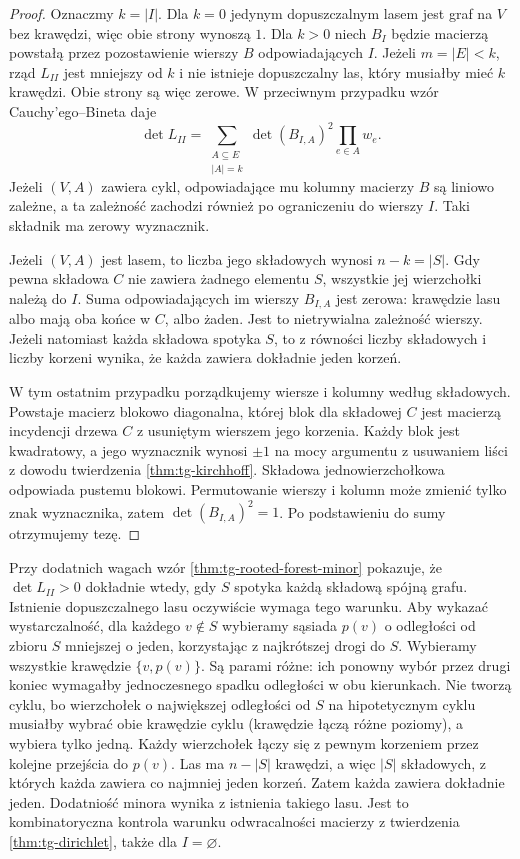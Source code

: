 \begin{proof}
Oznaczmy $k=|I|$. Dla $k=0$ jedynym dopuszczalnym
lasem jest graf na $V$ bez krawędzi, więc obie strony
wynoszą $1$. Dla $k>0$ niech $B_I$ będzie macierzą
powstałą przez pozostawienie wierszy $B$ odpowiadających
$I$. Jeżeli $m=|E|<k$, rząd $L_{II}$ jest mniejszy
od $k$ i nie istnieje dopuszczalny las, który musiałby
mieć $k$ krawędzi. Obie strony są więc zerowe.
W przeciwnym przypadku wzór Cauchy'ego--Bineta daje
\[
\det L_{II}=\sum_{\substack{A\subseteq E\\|A|=k}}
    \det(B_{I,A})^2\prod_{e\in A}w_e.
\]
Jeżeli $(V,A)$ zawiera cykl, odpowiadające mu kolumny
macierzy $B$ są liniowo zależne, a ta zależność zachodzi
również po ograniczeniu do wierszy $I$.
Taki składnik ma zerowy wyznacznik.

Jeżeli $(V,A)$ jest lasem, to liczba jego składowych
wynosi $n-k=|S|$. Gdy pewna składowa $C$ nie zawiera
żadnego elementu $S$, wszystkie jej wierzchołki należą
do $I$. Suma odpowiadających im wierszy $B_{I,A}$
jest zerowa: krawędzie lasu albo mają oba końce
w $C$, albo żaden. Jest to nietrywialna zależność
wierszy. Jeżeli natomiast każda składowa spotyka $S$,
to z równości liczby składowych i liczby korzeni
wynika, że każda zawiera dokładnie jeden korzeń.

W tym ostatnim przypadku porządkujemy wiersze
i kolumny według składowych. Powstaje macierz
blokowo diagonalna, której blok dla składowej $C$
jest macierzą incydencji drzewa $C$ z usuniętym
wierszem jego korzenia. Każdy blok jest kwadratowy,
a jego wyznacznik wynosi $\pm1$ na mocy argumentu
z usuwaniem liści z dowodu twierdzenia
\ref{thm:tg-kirchhoff}. Składowa jednowierzchołkowa
odpowiada pustemu blokowi. Permutowanie wierszy
i kolumn może zmienić tylko znak wyznacznika,
zatem $\det(B_{I,A})^2=1$.
Po podstawieniu do sumy otrzymujemy tezę.
\end{proof}

\begin{uwaga}
Przy dodatnich wagach wzór
\ref{thm:tg-rooted-forest-minor} pokazuje, że
$\det L_{II}>0$ dokładnie wtedy, gdy $S$
spotyka każdą składową spójną grafu.
Istnienie dopuszczalnego lasu oczywiście wymaga
tego warunku. Aby wykazać wystarczalność, dla
każdego $v\notin S$ wybieramy sąsiada $p(v)$
o odległości od zbioru $S$ mniejszej o jeden,
korzystając z najkrótszej drogi do $S$.
Wybieramy wszystkie krawędzie $\{v,p(v)\}$.
Są parami różne: ich ponowny wybór przez drugi
koniec wymagałby jednoczesnego spadku odległości
w obu kierunkach. Nie tworzą cyklu, bo wierzchołek
o największej odległości od $S$ na hipotetycznym
cyklu musiałby wybrać obie krawędzie cyklu
(krawędzie łączą różne poziomy), a wybiera tylko jedną.
Każdy wierzchołek łączy się z pewnym korzeniem
przez kolejne przejścia do $p(v)$. Las ma
$n-|S|$ krawędzi, a więc $|S|$ składowych,
z których każda zawiera co najmniej jeden korzeń.
Zatem każda zawiera dokładnie jeden.
Dodatniość minora wynika z istnienia takiego lasu.
Jest to kombinatoryczna kontrola warunku
odwracalności macierzy z twierdzenia
\ref{thm:tg-dirichlet}, także dla $I=\varnothing$.
\end{uwaga}

